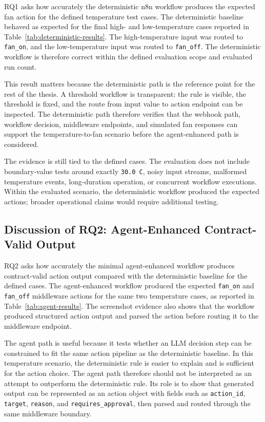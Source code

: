 RQ1 asks how accurately the deterministic n8n workflow produces the expected fan action for the defined temperature test cases. The deterministic baseline behaved as expected for the final high- and low-temperature cases reported in Table~\ref{tab:deterministic-results}. The high-temperature input was routed to \texttt{fan\_on}, and the low-temperature input was routed to \texttt{fan\_off}. The deterministic workflow is therefore correct within the defined evaluation scope and evaluated run count.

This result matters because the deterministic path is the reference point for the rest of the thesis. A threshold workflow is transparent: the rule is visible, the threshold is fixed, and the route from input value to action endpoint can be inspected. The deterministic path therefore verifies that the webhook path, workflow decision, middleware endpoints, and simulated fan responses can support the temperature-to-fan scenario before the agent-enhanced path is considered.

The evidence is still tied to the defined cases. The evaluation does not include boundary-value tests around exactly \texttt{30.0 C}, noisy input streams, malformed temperature events, long-duration operation, or concurrent workflow executions. Within the evaluated scenario, the deterministic workflow produced the expected actions; broader operational claims would require additional testing.

\subsection{Discussion of RQ2: Agent-Enhanced Contract-Valid Output}\label{subsec:discussion-rq2-agent}

RQ2 asks how accurately the minimal agent-enhanced workflow produces contract-valid action output compared with the deterministic baseline for the defined cases. The agent-enhanced workflow produced the expected \texttt{fan\_on} and \texttt{fan\_off} middleware actions for the same two temperature cases, as reported in Table~\ref{tab:agent-results}. The screenshot evidence also shows that the workflow produced structured action output and parsed the action before routing it to the middleware endpoint.

The agent path is useful because it tests whether an LLM decision step can be constrained to fit the same action pipeline as the deterministic baseline. In this temperature scenario, the deterministic rule is easier to explain and is sufficient for the action choice. The agent path therefore should not be interpreted as an attempt to outperform the deterministic rule. Its role is to show that generated output can be represented as an action object with fields such as \texttt{action\_id}, \texttt{target}, \texttt{reason}, and \texttt{requires\_approval}, then parsed and routed through the same middleware boundary.


